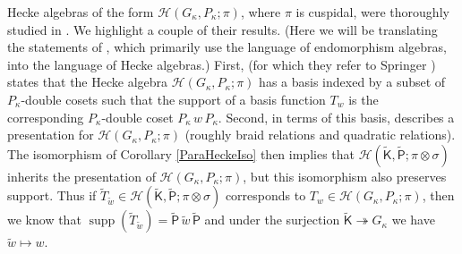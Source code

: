 \documentclass[10pt, letterpaper]{amsart}
\theoremstyle{plain}
\theoremstyle{definition}
\numberwithin{equation}{section}
\newcommand{\wt}{\tilde{w}}
\newcommand{\Tt}{\widetilde{T}}
\newcommand{\supp}{\operatorname{supp}}
\newcommand{\Hcal}{\mathcal{H}}
\newcommand{\Kft}{\widetilde{\mathsf{K}}}
\newcommand{\Pft}{\widetilde{\mathsf{P}}}
\begin{document}
Hecke algebras of the form $\Hcal(G_{\kappa},P_{\kappa};\pi)$, where $\pi$ is cuspidal, were thoroughly studied in \cite{HL80}. We highlight a couple of their results. (Here we will be translating the statements of \cite{HL80}, which primarily use the language of endomorphism algebras, into the language of Hecke algebras.) First, \cite[Proposition (3.9)]{HL80} (for which they refer to Springer \cite[pp. 635-636]{S71}) states that the Hecke algebra $\Hcal(G_{\kappa},P_{\kappa};\pi)$ has a basis indexed by a subset of $P_{\kappa}$-double cosets such that the support of a basis function $T_{w}$ is the corresponding $P_{\kappa}$-double coset $P_{\kappa}\,w\,P_{\kappa}$.  Second, in terms of this basis, \cite[Theorem (4.14)]{HL80} describes a presentation for $\Hcal(G_{\kappa},P_{\kappa}; \pi)$ (roughly braid relations and quadratic relations). The isomorphism of Corollary \ref{ParaHeckeIso} then implies that $\Hcal(\Kft,\Pft; \pi\otimes \sigma)$ inherits the presentation of $\Hcal(G_{\kappa},P_{\kappa}; \pi)$, but this isomorphism also preserves support. Thus if $\Tt_{\wt}\in \Hcal(\Kft, \Pft; \pi\otimes \sigma)$ corresponds to $T_{w}\in \Hcal(G_{\kappa}, P_{\kappa}; \pi)$, then we know that $\supp(\Tt_{\wt})=\Pft\,\wt\, \Pft$ and under the surjection $\Kft\twoheadrightarrow G_{\kappa}$ we have $\wt\mapsto w$.
\end{document}
